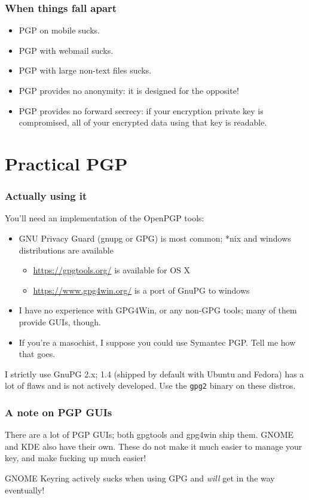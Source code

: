 \documentclass[aspectratio=1610,bigger,utf8]{beamer}
\begin{document}
\begin{frame}
	\frametitle{When things fall apart}
	\begin{itemize}
		\item PGP on mobile sucks.
		\item PGP with webmail sucks.
		\item PGP with large non-text files sucks.
		\item PGP provides no anonymity: it is designed for the
			opposite!
		\item PGP provides no forward secrecy: if your encryption
			private key is compromised, all of your encrypted data
			using that key is readable.

	\end{itemize}
\end{frame}

\section{Practical PGP}
\begin{frame}
	\frametitle{Actually using it}
	You'll need an implementation of the OpenPGP tools:
	\begin{itemize}
		\item GNU Privacy Guard (gnupg or GPG) is most common; *nix and
			windows distributions are available
			\begin{itemize}
				\item \url{https://gpgtools.org/} is available
					for OS X
				\item \url{https://www.gpg4win.org/} is a port
					of GnuPG to windows
			\end{itemize}
		\item I have no experience with GPG4Win, or any non-GPG tools;
			many of them provide GUIs, though.
		\item If you're a masochist, I suppose you could use
			\alert{Symantec PGP}. Tell me how that goes.
	\end{itemize}
	I strictly use GnuPG 2.x; 1.4 (shipped by default with Ubuntu and
	Fedora) has a lot of flaws and is not actively developed. Use the
	\texttt{gpg2} binary on these distros.
\end{frame}
\begin{frame}
	\frametitle{A note on PGP GUIs}
	There are a lot of PGP GUIs; both gpgtools and gpg4win ship them. GNOME
	and KDE also have their own. These do not make it much easier to manage
	your key, and make fucking up much easier!

	GNOME Keyring actively sucks when using GPG and \emph{will} get in the
	way eventually!
\end{frame}
\end{document}
